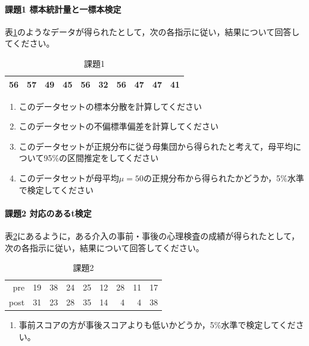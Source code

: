 \documentclass{ltjsbook}
\begin{document}
\paragraph{課題1 標本統計量と一標本検定}
表\ref{exe:20_1}のようなデータが得られたとして，次の各指示に従い，結果について回答してください。
\begin{table}[ht]
    \centering
    \caption{課題1}
    \label{exe:20_1}
    \begin{tabular}{rrrrrrrrrr}
      \hline
    56 & 57 & 49 & 45 & 56 & 32 & 56 & 47 & 47 & 41 \\ 
       \hline
    \end{tabular}
    \end{table}
\begin{enumerate}
    \item このデータセットの標本分散を計算してください
    \item このデータセットの不偏標準偏差を計算してください
    \item このデータセットが正規分布に従う母集団から得られたと考えて，母平均について95\%の区間推定をしてください
    \item このデータセットが母平均$\mu=50$の正規分布から得られたかどうか，5\%水準で検定してください
\end{enumerate}

\paragraph{課題2 対応のあるt検定}
表\ref{exe:20_2}にあるように，ある介入の事前・事後の心理検査の成績が得られたとして，次の各指示に従い，結果について回答してください。
\begin{table}[ht]
    \centering
    \caption{課題2}
    \label{exe:20_2}
    \begin{tabular}{rrrrrrrrr}
      \hline
    pre & 19 & 38 & 24 & 25 & 12 & 28 & 11 & 17 \\ 
      post & 31 & 23 & 28 & 35 & 14 & 4 & 4 & 38 \\ 
       \hline
    \end{tabular}
\end{table}

\begin{enumerate}
    \item 事前スコアの方が事後スコアよりも低いかどうか，5\%水準で検定してください。
\end{enumerate}
\end{document}
